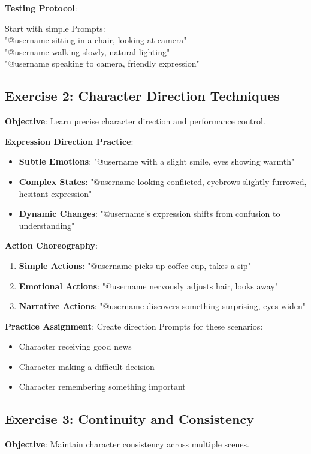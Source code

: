 \textbf{Testing Protocol}:
\begin{Prompt}
Start with simple Prompts:\\
"@username sitting in a chair, looking at camera"\\
"@username walking slowly, natural lighting"\\
"@username speaking to camera, friendly expression"
\end{Prompt}

\subsection*{Exercise 2: Character Direction Techniques}
\textbf{Objective}: Learn precise character direction and performance control.

\textbf{Expression Direction Practice}:
\begin{itemize}
\item \textbf{Subtle Emotions}: "@username with a slight smile, eyes showing warmth"
\item \textbf{Complex States}: "@username looking conflicted, eyebrows slightly furrowed, hesitant expression"
\item \textbf{Dynamic Changes}: "@username's expression shifts from confusion to understanding"
\end{itemize}

\textbf{Action Choreography}:
\begin{enumerate}
\item \textbf{Simple Actions}: "@username picks up coffee cup, takes a sip"
\item \textbf{Emotional Actions}: "@username nervously adjusts hair, looks away"
\item \textbf{Narrative Actions}: "@username discovers something surprising, eyes widen"
\end{enumerate}

\textbf{Practice Assignment}: Create direction Prompts for these scenarios:
\begin{itemize}
\item Character receiving good news
\item Character making a difficult decision
\item Character remembering something important
\end{itemize}

\subsection*{Exercise 3: Continuity and Consistency}
\textbf{Objective}: Maintain character consistency across multiple scenes.

